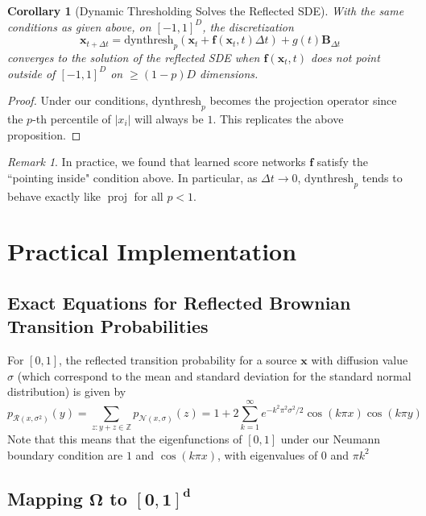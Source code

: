 \documentclass{article}
\theoremstyle{plain}
\newtheorem{corollary}[theorem]{Corollary}
\theoremstyle{definition}
\theoremstyle{remark}
\newtheorem{remark}[theorem]{Remark}
\DeclareMathOperator{\proj}{proj}
\newcommand{\Z}{\mathbb{Z}}
\renewcommand{\vec}{\mathbf}
\begin{document}
\begin{corollary}[Dynamic Thresholding Solves the Reflected SDE]
    With the same conditions as given above, on $[-1, 1]^D$, the discretization
    \begin{equation}
        \vec{x}_{t + \Delta t} = \mathrm{dynthresh}_p(\vec{x}_t + \vec{f}(\vec{x}_t, t) \Delta t) + g(t) \vec{B}_{\Delta t}
    \end{equation}
    converges to the solution of the reflected SDE when $\vec{f}(\vec{x}_t, t)$ does not point outside of $[-1, 1]^D$ on $\ge (1 - p)D$ dimensions.
\end{corollary}
\begin{proof}
    Under our conditions, $\mathrm{dynthresh}_p$ becomes the projection operator since the $p$-th percentile of $|x_i|$ will always be $1$. This replicates the above proposition.
\end{proof}
\begin{remark}
    In practice, we found that learned score networks $\vec{f}$ satisfy the ``pointing inside" condition above. In particular, as $\Delta t \to 0$, $\mathrm{dynthresh}_p$ tends to behave exactly like $\proj$ for all $p < 1$.
\end{remark} \section{Practical Implementation}

\subsection{Exact Equations for Reflected Brownian Transition Probabilities}

For $[0, 1]$, the reflected transition probability for a source $\vec{x}$ with diffusion value $\sigma$ (which correspond to the mean and standard deviation for the standard normal distribution) is given by
\begin{equation}
    p_{\mathcal{R}(x, \sigma^2)}(y) = \sum_{z: y + z \in \Z} p_{\mathcal{N}(x, \sigma)}(z) = 1 + 2\sum_{k = 1}^\infty e^{-k^2 \pi^2 \sigma^2/2} \cos(k\pi x) \cos(k\pi y)
\end{equation}
Note that this means that the eigenfunctions of $[0, 1]$ under our Neumann boundary condition are $1$ and $\cos(k\pi x)$, with eigenvalues of $0$ and $\pi k^2$

\subsection{Mapping $\mathbf{\Omega}$ to $\mathbf{[0, 1]^d}$}\label{sec:app:prac:diffmap}
\end{document}
